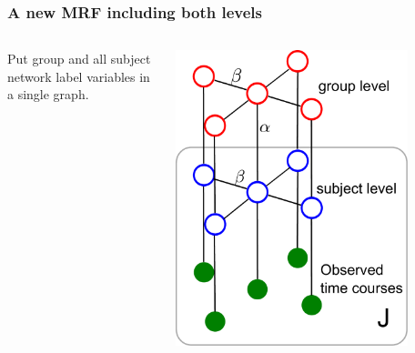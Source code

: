 \documentclass[serif]{beamer}
\begin{document}
\begin{frame}
  \frametitle{A new MRF including both levels}
  \begin{columns}
    \begin{column}{5cm}
      \begin{block}{}
        Put group and all subject network label variables in a single graph.
      \end{block}
    \end{column}

    \begin{column}{6cm}
    \includegraphics[width=0.8\textwidth]{figure1/grp2}
    \end{column}
  \end{columns}
\end{frame}
\end{document}
